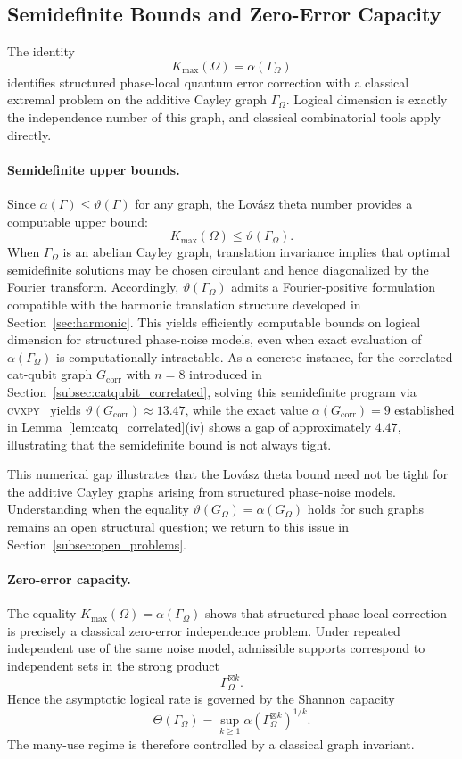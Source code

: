 \documentclass[a4paper,twocolumn,11pt,allowtoday]{quantumarticle}
\theoremstyle{plain}
\theoremstyle{definition}
\theoremstyle{remark}
\begin{document}
\subsection{Semidefinite Bounds and Zero-Error Capacity}
\label{subsec:zero_error_theta}

The identity
\[
K_{\max}(\Omega)=\alpha(\Gamma_\Omega)
\]
identifies structured phase-local quantum error correction with a classical extremal problem on the additive Cayley graph $\Gamma_\Omega$. Logical dimension is exactly the independence number of this graph, and classical combinatorial tools apply directly.


\paragraph{Semidefinite upper bounds.}
Since $\alpha(\Gamma)\le\vartheta(\Gamma)$ for any graph, the Lov\'{a}sz
theta number provides a computable upper bound:
\[
K_{\max}(\Omega)\le\vartheta(\Gamma_\Omega).
\]
When $\Gamma_\Omega$ is an abelian Cayley graph, translation invariance
implies that optimal semidefinite solutions may be chosen circulant
and hence diagonalized by the Fourier transform. Accordingly,
$\vartheta(\Gamma_\Omega)$ admits a Fourier-positive formulation
compatible with the harmonic translation structure developed in
Section~\ref{sec:harmonic}. This yields efficiently computable bounds
on logical dimension for structured phase-noise models, even when
exact evaluation of $\alpha(\Gamma_\Omega)$ is computationally
intractable. As a concrete instance, for the correlated cat-qubit
graph $G_{\mathrm{corr}}$ with $n=8$ introduced in
Section~\ref{subsec:catqubit_correlated}, solving this semidefinite
program via \textsc{cvxpy}~\cite{cvxpy} yields
$\vartheta(G_{\mathrm{corr}})\approx 13.47$, while the exact value
$\alpha(G_{\mathrm{corr}})=9$ established in
Lemma~\ref{lem:catq_correlated}\textup{(iv)} shows a gap of
approximately $4.47$, illustrating that the semidefinite bound
is not always tight.

This numerical gap illustrates that the Lov\'asz theta bound
need not be tight for the additive Cayley graphs arising from
structured phase-noise models. Understanding when the equality
$\vartheta(G_\Omega)=\alpha(G_\Omega)$ holds for such graphs
remains an open structural question; we return to this issue
in Section~\ref{subsec:open_problems}.




\paragraph{Zero-error capacity.}
The equality $K_{\max}(\Omega)=\alpha(\Gamma_\Omega)$ shows that structured phase-local correction is precisely a classical zero-error independence problem. Under repeated independent use of the same noise model, admissible supports correspond to independent sets in the strong product
\[
\Gamma_\Omega^{\boxtimes k}.
\]
Hence the asymptotic logical rate is governed by the Shannon capacity
\[
\Theta(\Gamma_\Omega)=\sup_{k\ge1}\alpha(\Gamma_\Omega^{\boxtimes k})^{1/k}.
\]
The many-use regime is therefore controlled by a classical graph invariant.
\end{document}

